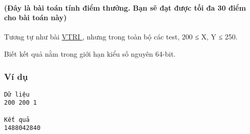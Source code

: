 



\paragraph{   (Đây là bài toán tính điểm thưởng. Bạn sẽ đạt được tối đa 30 điểm cho bài toán này)  }

   Tương tự như bài   \href{/problems/show/VTRI}{    VTRI   }   , nhưng trong toàn bộ các test, 200 ≤ X, Y ≤ 250.  

   Biết kết quả nằm trong giới hạn kiểu số nguyên 64-bit.  

\subsubsection{   Ví dụ  }
\begin{verbatim}
Dữ liệu
200 200 1

Kết quả
1488042840
\end{verbatim}